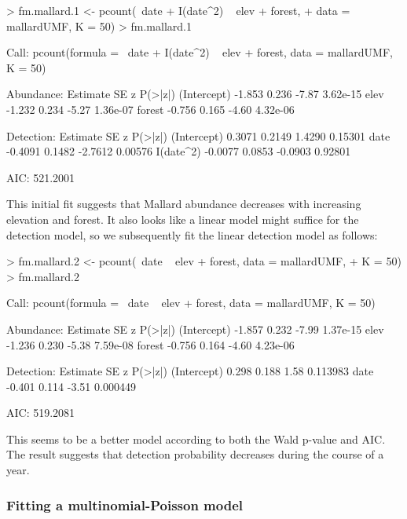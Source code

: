 \documentclass[article,shortnames]{jss}
\begin{document}
{\begin{Schunk}
\begin{Sinput}
> fm.mallard.1 <- pcount(~date + I(date^2) ~ elev + forest, 
+     data = mallardUMF, K = 50)
> fm.mallard.1
\end{Sinput}
\begin{Soutput}
Call:
pcount(formula = ~date + I(date^2) ~ elev + forest, data = mallardUMF, 
    K = 50)

Abundance:
            Estimate    SE     z  P(>|z|)
(Intercept)   -1.853 0.236 -7.87 3.62e-15
elev          -1.232 0.234 -5.27 1.36e-07
forest        -0.756 0.165 -4.60 4.32e-06

Detection:
            Estimate     SE       z P(>|z|)
(Intercept)   0.3071 0.2149  1.4290 0.15301
date         -0.4091 0.1482 -2.7612 0.00576
I(date^2)    -0.0077 0.0853 -0.0903 0.92801

AIC: 521.2001 
\end{Soutput}
\end{Schunk}

This initial fit suggests that Mallard abundance decreases with
increasing elevation and forest.  It also looks like a linear model
might suffice for the detection model, so we subsequently fit the
linear detection model as follows:


\begin{Schunk}
\begin{Sinput}
> fm.mallard.2 <- pcount(~date ~ elev + forest, data = mallardUMF, 
+     K = 50)
> fm.mallard.2
\end{Sinput}
\begin{Soutput}
Call:
pcount(formula = ~date ~ elev + forest, data = mallardUMF, K = 50)

Abundance:
            Estimate    SE     z  P(>|z|)
(Intercept)   -1.857 0.232 -7.99 1.37e-15
elev          -1.236 0.230 -5.38 7.59e-08
forest        -0.756 0.164 -4.60 4.23e-06

Detection:
            Estimate    SE     z  P(>|z|)
(Intercept)    0.298 0.188  1.58 0.113983
date          -0.401 0.114 -3.51 0.000449

AIC: 519.2081 
\end{Soutput}
\end{Schunk}

This seems to be a better model according to both the Wald p-value and
AIC.  The result suggests that detection probability decreases during the 
course of a year.



\subsubsection{Fitting a multinomial-Poisson model}

}
\end{document}
